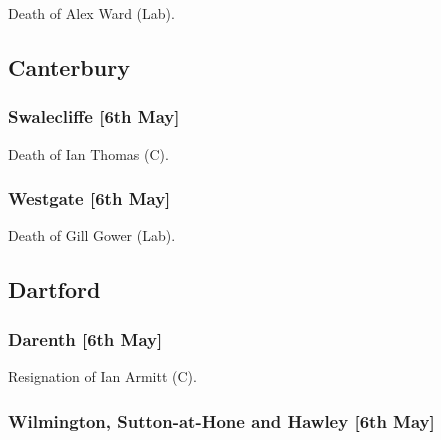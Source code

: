 \documentclass[a4paper,openany]{book}
\begin{document}
\begin{resultsiii}
Death of Alex Ward (Lab).

\subsection*{Canterbury}

\subsubsection*{Swalecliffe \hspace*{\fill}\nolinebreak[1]%
	\enspace\hspace*{\fill}
	[6th May]}


Death of Ian Thomas (C).

\subsubsection*{Westgate \hspace*{\fill}\nolinebreak[1]%
	\enspace\hspace*{\fill}
	[6th May]}


Death of Gill Gower (Lab).

\subsection*{Dartford}

\subsubsection*{Darenth \hspace*{\fill}\nolinebreak[1]%
	\enspace\hspace*{\fill}
	[6th May]}


Resignation of Ian Armitt (C).

\subsubsection*{Wilmington, Sutton-at-Hone and Hawley \hspace*{\fill}\nolinebreak[1]%
	\enspace\hspace*{\fill}
	[6th May]}


\end{resultsiii}
\end{document}
